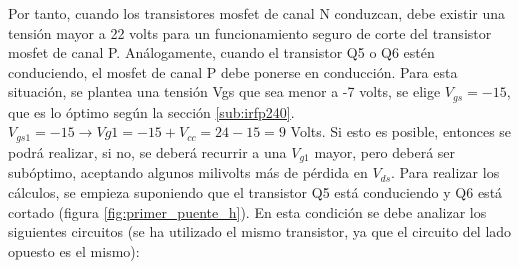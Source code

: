 Por tanto, cuando los transistores mosfet de canal N conduzcan, debe existir una tensión mayor a 22 volts para un funcionamiento seguro de corte del transistor mosfet de canal P.  
%
Análogamente, cuando el transistor Q5 o Q6 estén conduciendo, el mosfet de canal P debe ponerse en conducción. Para esta situación, se plantea una tensión Vgs que sea menor a -7 volts, se elige $V_{gs}  = -15$, que es lo óptimo según la sección \ref{sub:irfp240}. $V_{gs1} = -15\rightarrow Vg 1= -15+V_{cc} = 24-15 = 9$ Volts. Si esto es posible, entonces se podrá realizar, si no, se deberá recurrir a una $V_{g1}$ mayor, pero deberá ser subóptimo, aceptando algunos milivolts más de pérdida en $V_{ds}$. 
%
Para realizar los cálculos, se empieza suponiendo que el transistor Q5 está conduciendo y Q6 está cortado (figura \ref{fig:primer_puente_h}). En esta condición se debe analizar los siguientes circuitos (se ha utilizado el mismo transistor, ya que el circuito del lado opuesto es el mismo): 
